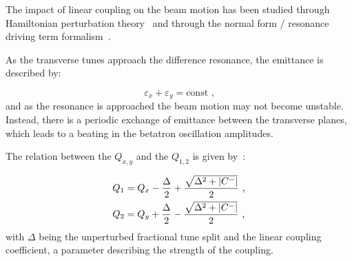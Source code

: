 The impact of linear coupling on the beam motion has been studied through Hamiltonian perturbation theory~\cite{PHREV:Guignard:Betatron_Coupling_Radiation,BOOK:Wiedemann:Particle_Accelerator_Physics} and through the normal form / resonance driving term formalism~\cite{PHD:Franchi}.

As the transverse tunes approach the difference resonance, the emittance is described by:

\begin{equation}
    \varepsilon_x + \varepsilon_y = \mathrm{const} \text{ ,}
    \label{equation:coupled_emittances_difference_resonance}
\end{equation}
and as the resonance is approached the beam motion may not become unstable.
Instead, there is a periodic exchange of emittance between the transverse planes, which leads to a beating in the betatron oscillation amplitudes.

The relation between the  \(Q_{x,y}\) and the  \(Q_{1,2}\) is given by~\cite{CAS:Bryant:Theory_Weak_Betatron_Coupling}:

\begin{equation}
    \begin{aligned}
        Q_1 &= Q_x- \frac{\Delta}{2} + \frac{\sqrt{\Delta^2 + \left\lvert C^{-} \right\rvert}}{2} \text{ ,} \\
        Q_2 &= Q_y+ \frac{\Delta}{2} - \frac{\sqrt{\Delta^2 + \left\lvert C^{-} \right\rvert}}{2} \text{ ,}
    \end{aligned}
    \label{equation:unperturbed_tunes_to_coupled_tunes}
\end{equation}
with \(\Delta\) being the unperturbed fractional tune split and \AbsCminus the linear coupling coefficient, a parameter describing the strength of the coupling.

